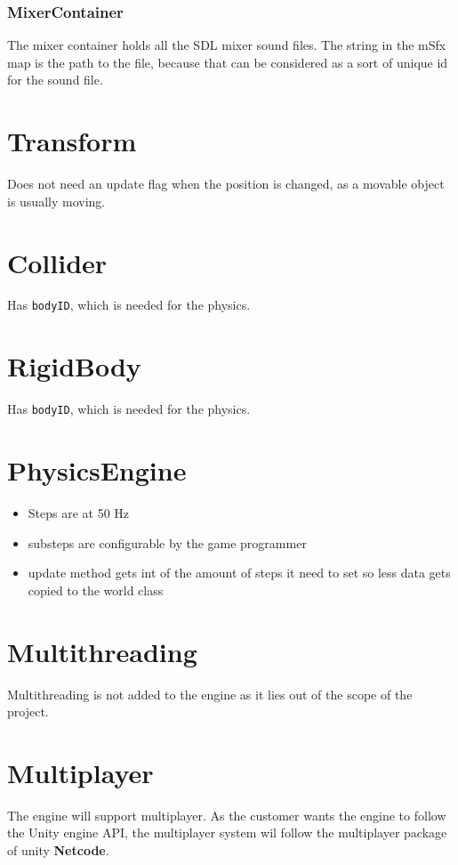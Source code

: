 \documentclass[draft]{article}
\begin{document}
\subsubsection{MixerContainer}
The mixer container holds all the
SDL mixer sound files.
The string in the mSfx map is the path to the file, because that can be considered as a sort of unique id for the sound file.

\section{Transform}
Does not need an update flag when the position is changed, as a movable object is usually moving.

\section{Collider}
Has \texttt{bodyID}, which is needed for the physics.

\section{RigidBody}
Has \texttt{bodyID}, which is needed for the physics.

\section{PhysicsEngine}{
  \begin{itemize}
    \item Steps are at 50 Hz
    \item substeps are configurable by the game programmer
    \item update method gets int of the amount of steps it need to set so less data gets copied to the world class
  \end{itemize}
 }

\section{Multithreading}
Multithreading is not added to the engine as it lies out of the scope of the project.

\section{Multiplayer}
The engine will support multiplayer.
As the customer wants the engine to follow the Unity engine API, the multiplayer system wil follow the multiplayer package of unity \textbf{Netcode}.
\end{document}
